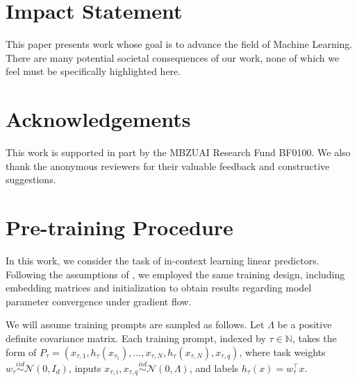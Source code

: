 \documentclass{article}
\theoremstyle{plain}
\theoremstyle{definition}
\theoremstyle{remark}
\begin{document}
\section*{Impact Statement}
This paper presents work whose goal is to advance the field of Machine Learning. There are many potential societal consequences of our work, none of which we feel must be specifically highlighted here.

\section*{Acknowledgements}
This work is supported in part by the MBZUAI Research Fund BF0100. We also thank the anonymous reviewers for their valuable feedback and constructive suggestions.




\newpage
\appendix
\onecolumn
\vspace{-0.1in}\section{Pre-training Procedure}
In this work, we consider the task of in-context learning linear predictors. Following the assumptions of \citet{zhang2024trained}, we employed the same training design, including embedding matrices and initialization to obtain results regarding model parameter convergence under gradient flow. 

We will assume training prompts are sampled as follows. Let $\Lambda$ be a positive definite covariance matrix.  Each training prompt, indexed by $\tau \in \mathbb{N}$, takes the form of $P_\tau = (x_{\tau, 1}, h_\tau(x_{\tau_1}), \dots, x_{\tau, N}, h_\tau(x_{\tau, N}), x_{\tau, q})$, where task weights $w_\tau \overset{iid}{\sim} \mathcal{N}(0, I_d)$, inputs $x_{\tau, i}, x_{\tau, q} \overset{iid}{\sim} \mathcal{N}(0, \Lambda)$, and labels $h_{\tau}(x) = w^\top_\tau x$.  
 
\end{document}
